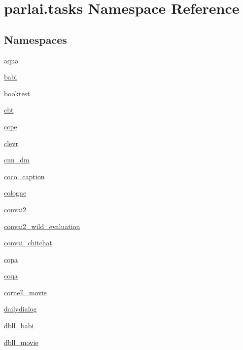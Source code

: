 \hypertarget{namespaceparlai_1_1tasks}{}\section{parlai.\+tasks Namespace Reference}
\label{namespaceparlai_1_1tasks}
\subsection*{Namespaces}
\begin{DoxyCompactItemize}
\item 
 \hyperlink{namespaceparlai_1_1tasks_1_1aqua}{aqua}
\item 
 \hyperlink{namespaceparlai_1_1tasks_1_1babi}{babi}
\item 
 \hyperlink{namespaceparlai_1_1tasks_1_1booktest}{booktest}
\item 
 \hyperlink{namespaceparlai_1_1tasks_1_1cbt}{cbt}
\item 
 \hyperlink{namespaceparlai_1_1tasks_1_1ccpe}{ccpe}
\item 
 \hyperlink{namespaceparlai_1_1tasks_1_1clevr}{clevr}
\item 
 \hyperlink{namespaceparlai_1_1tasks_1_1cnn__dm}{cnn\+\_\+dm}
\item 
 \hyperlink{namespaceparlai_1_1tasks_1_1coco__caption}{coco\+\_\+caption}
\item 
 \hyperlink{namespaceparlai_1_1tasks_1_1cologne}{cologne}
\item 
 \hyperlink{namespaceparlai_1_1tasks_1_1convai2}{convai2}
\item 
 \hyperlink{namespaceparlai_1_1tasks_1_1convai2__wild__evaluation}{convai2\+\_\+wild\+\_\+evaluation}
\item 
 \hyperlink{namespaceparlai_1_1tasks_1_1convai__chitchat}{convai\+\_\+chitchat}
\item 
 \hyperlink{namespaceparlai_1_1tasks_1_1copa}{copa}
\item 
 \hyperlink{namespaceparlai_1_1tasks_1_1coqa}{coqa}
\item 
 \hyperlink{namespaceparlai_1_1tasks_1_1cornell__movie}{cornell\+\_\+movie}
\item 
 \hyperlink{namespaceparlai_1_1tasks_1_1dailydialog}{dailydialog}
\item 
 \hyperlink{namespaceparlai_1_1tasks_1_1dbll__babi}{dbll\+\_\+babi}
\item 
 \hyperlink{namespaceparlai_1_1tasks_1_1dbll__movie}{dbll\+\_\+movie}
\item 

\end{DoxyCompactItemize}
